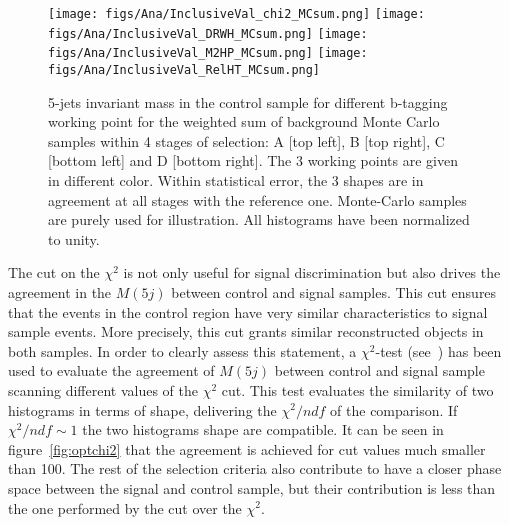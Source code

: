 \begin{figure}[!Hhtbp]
  \begin{center}
    \texttt{[image: figs/Ana/InclusiveVal\_chi2\_MCsum.png]}
    \texttt{[image: figs/Ana/InclusiveVal\_DRWH\_MCsum.png]}
    \texttt{[image: figs/Ana/InclusiveVal\_M2HP\_MCsum.png]}
    \texttt{[image: figs/Ana/InclusiveVal\_RelHT\_MCsum.png]}
    \caption{5-jets invariant mass in the control sample for different b-tagging working point for the weighted sum of background Monte Carlo samples within 4 stages of selection: A [top left], B [top right], C [bottom left] and D [bottom right]. The 3 working points are given in different color. Within statistical error, the 3 shapes are in agreement at all stages with the reference one. Monte-Carlo samples are purely used for illustration. All histograms have been normalized to unity.}
    \label{fig:StageWPSum}
  \end{center}
\end{figure}

The cut on the $\chi^{2}$ is not only useful for signal discrimination but also drives the agreement in the $M(5j)$ between control and signal samples. This cut ensures that the events in the control region have very similar characteristics to signal sample events. More precisely, this cut grants similar reconstructed objects in both samples. In order to clearly assess this statement, a $\chi^{2}$-test (see~\cite{2006physics...5123G}) has been used to evaluate the agreement of $M(5j)$ between control and signal sample scanning different values of the $\chi^{2}$ cut. This test evaluates the similarity of two histograms in terms of shape, delivering the $\chi^{2}/ndf$ of the comparison. If $\chi^{2}/ndf\sim 1$ the two histograms shape are compatible. It can be seen in figure~\ref{fig:optchi2} that the agreement is achieved for cut values much smaller than 100. The rest of the selection criteria also contribute to have a closer phase space between the signal and control sample, but their contribution is less than the one performed by the cut over the $\chi^{2}$.

